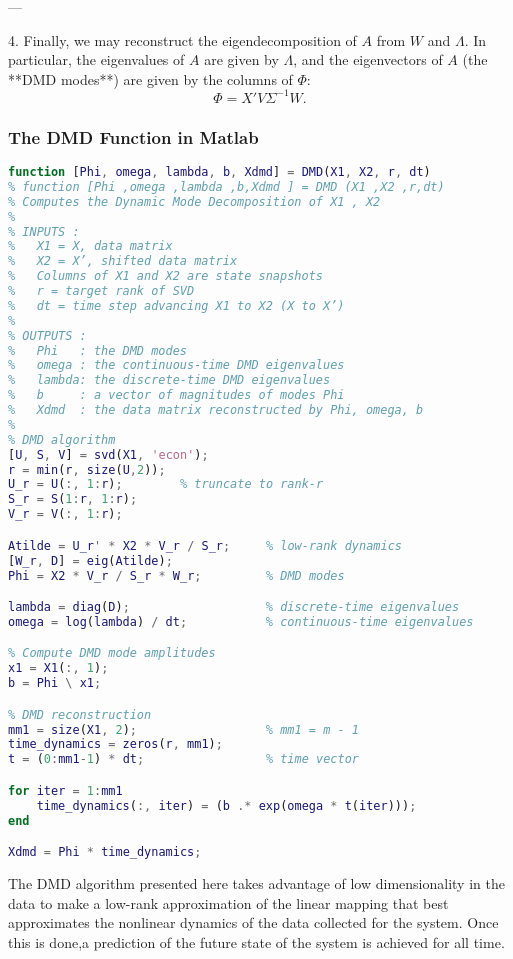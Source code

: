 \documentclass{article}
\begin{document}
---

4. Finally, we may reconstruct the eigendecomposition of $A$ from $W$ and $\Lambda$.  
In particular, the eigenvalues of $A$ are given by $\Lambda$, and the eigenvectors of $A$ 
(the **DMD modes**) are given by the columns of $\Phi$:
\[
\Phi = X' V \Sigma^{-1} W.
\]

\vspace{1cm}

\subsubsection*{The DMD Function in Matlab}



\begin{lstlisting}[language=Matlab, caption={}]
function [Phi, omega, lambda, b, Xdmd] = DMD(X1, X2, r, dt)
% function [Phi ,omega ,lambda ,b,Xdmd ] = DMD (X1 ,X2 ,r,dt)
% Computes the Dynamic Mode Decomposition of X1 , X2
%
% INPUTS :
%   X1 = X, data matrix
%   X2 = X’, shifted data matrix
%   Columns of X1 and X2 are state snapshots
%   r = target rank of SVD
%   dt = time step advancing X1 to X2 (X to X’)
%
% OUTPUTS :
%   Phi   : the DMD modes
%   omega : the continuous-time DMD eigenvalues
%   lambda: the discrete-time DMD eigenvalues
%   b     : a vector of magnitudes of modes Phi
%   Xdmd  : the data matrix reconstructed by Phi, omega, b
%
% DMD algorithm
[U, S, V] = svd(X1, 'econ');
r = min(r, size(U,2));
U_r = U(:, 1:r);        % truncate to rank-r
S_r = S(1:r, 1:r);
V_r = V(:, 1:r);

Atilde = U_r' * X2 * V_r / S_r;     % low-rank dynamics
[W_r, D] = eig(Atilde);
Phi = X2 * V_r / S_r * W_r;         % DMD modes

lambda = diag(D);                   % discrete-time eigenvalues
omega = log(lambda) / dt;           % continuous-time eigenvalues

% Compute DMD mode amplitudes
x1 = X1(:, 1);
b = Phi \ x1;

% DMD reconstruction
mm1 = size(X1, 2);                  % mm1 = m - 1
time_dynamics = zeros(r, mm1);
t = (0:mm1-1) * dt;                 % time vector

for iter = 1:mm1
    time_dynamics(:, iter) = (b .* exp(omega * t(iter)));
end

Xdmd = Phi * time_dynamics;
\end{lstlisting}

\vspace{1cm}

The DMD algorithm presented here takes advantage of low dimensionality in the data to make a low-rank approximation of the linear mapping that best approximates the nonlinear dynamics of the data collected for the system. Once this is done,a prediction of the future state of the system is achieved for all time.
\end{document}
